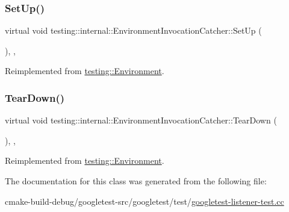 \subsubsection{\texorpdfstring{SetUp()}{SetUp()}}
{\footnotesize\ttfamily virtual void testing\+::internal\+::\+Environment\+Invocation\+Catcher\+::\+Set\+Up (\begin{DoxyParamCaption}{ }\end{DoxyParamCaption})\hspace{0.3cm}{\ttfamily [inline]}, {\ttfamily [protected]}, {\ttfamily [virtual]}}



Reimplemented from \mbox{\hyperlink{classtesting_1_1Environment_a1bf8cafaa9d4eba9feb98655ee434eb3}{testing\+::\+Environment}}.

\mbox{\label{classtesting_1_1internal_1_1EnvironmentInvocationCatcher_afc89ee0a8e32e6746a89fcc1682f62e9}} 
\subsubsection{\texorpdfstring{TearDown()}{TearDown()}}
{\footnotesize\ttfamily virtual void testing\+::internal\+::\+Environment\+Invocation\+Catcher\+::\+Tear\+Down (\begin{DoxyParamCaption}{ }\end{DoxyParamCaption})\hspace{0.3cm}{\ttfamily [inline]}, {\ttfamily [protected]}, {\ttfamily [virtual]}}



Reimplemented from \mbox{\hyperlink{classtesting_1_1Environment_a039bdaa705c46b9b88234cf4d3bb6254}{testing\+::\+Environment}}.



The documentation for this class was generated from the following file\+:\begin{DoxyCompactItemize}
\item 
cmake-\/build-\/debug/googletest-\/src/googletest/test/\mbox{\hyperlink{googletest-listener-test_8cc}{googletest-\/listener-\/test.\+cc}}\end{DoxyCompactItemize}
